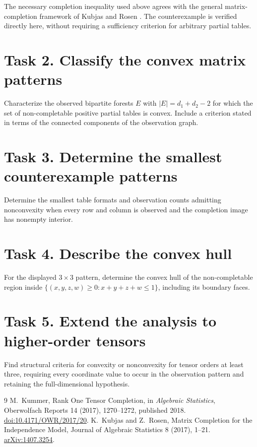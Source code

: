 \documentclass[11pt]{article}
\begin{document}
The necessary completion inequality used above agrees with the
general matrix-completion framework of Kubjas and Rosen \cite{KR}.
The counterexample is verified directly here, without requiring a
sufficiency criterion for arbitrary partial tables.

\section*{Task 2. Classify the convex matrix patterns}
Characterize the observed bipartite forests $E$ with
$|E|=d_1+d_2-2$ for which the set of non-completable positive partial
tables is convex. Include a criterion stated in terms of the connected
components of the observation graph.

\section*{Task 3. Determine the smallest counterexample patterns}
Determine the smallest table formats and observation counts admitting
nonconvexity when every row and column is observed and the completion
image has nonempty interior.

\section*{Task 4. Describe the convex hull}
For the displayed $3\times3$ pattern, determine the convex hull of the
non-completable region inside
$\{(x,y,z,w)\geq0:x+y+z+w\leq1\}$, including its boundary faces.

\section*{Task 5. Extend the analysis to higher-order tensors}
Find structural criteria for convexity or nonconvexity for tensor
orders at least three, requiring every coordinate value to occur in
the observation pattern and retaining the full-dimensional hypothesis.

\begin{thebibliography}{9}
M.~Kummer, Rank One Tensor Completion, in \emph{Algebraic Statistics},
Oberwolfach Reports 14 (2017), 1270--1272, published 2018.
\href{https://doi.org/10.4171/OWR/2017/20}{doi:10.4171/OWR/2017/20}.
K.~Kubjas and Z.~Rosen, Matrix Completion for the Independence Model,
Journal of Algebraic Statistics 8 (2017), 1--21.
\href{https://arxiv.org/abs/1407.3254}{arXiv:1407.3254}.
\end{thebibliography}
\end{document}
